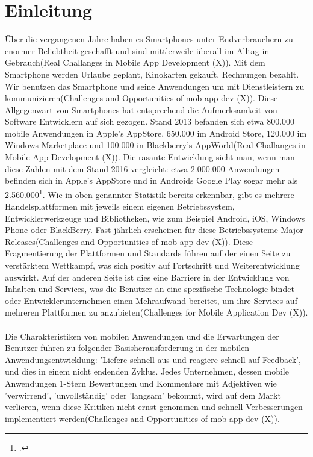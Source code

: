 \chapter{Einleitung}

Über die vergangenen Jahre haben es Smartphones unter Endverbrauchern zu enormer Beliebtheit geschafft und sind mittlerweile überall im Alltag in Gebrauch(Real Challanges in Mobile App Development (X)). Mit dem Smartphone werden Urlaube geplant, Kinokarten gekauft, Rechnungen bezahlt. Wir benutzen das Smartphone und seine Anwendungen um mit Dienstleistern zu kommunizieren(Challenges and Opportunities of mob app dev (X)). Diese Allgegenwart von Smartphones hat entsprechend die Aufmerksamkeit von Software Entwicklern auf sich gezogen. Stand 2013 befanden sich etwa 800.000 mobile Anwendungen in Apple's AppStore, 650.000 im Android Store, 120.000 im Windows Marketplace und 100.000 in Blackberry's AppWorld(Real Challanges in Mobile App Development (X)). Die rasante Entwicklung sieht man, wenn man diese Zahlen mit dem Stand 2016 vergleicht: etwa 2.000.000 Anwendungen befinden sich in Apple's AppStore und in Androids Google Play sogar mehr als 2.560.000\footcite{StatistikApps}. Wie in oben genannter Statistik bereits erkennbar, gibt es mehrere Handelsplattformen mit jeweils einem eigenen Betriebssystem, Entwicklerwerkzeuge und Bibliotheken, wie zum Beispiel Android, iOS, Windows Phone oder BlackBerry. Fast jährlich erscheinen für diese Betriebssysteme Major Releases(Challenges and Opportunities of mob app dev (X)). Diese Fragmentierung der Plattformen und Standards führen auf der einen Seite zu verstärktem Wettkampf, was sich positiv auf Fortschritt und Weiterentwicklung auswirkt. Auf der anderen Seite ist dies eine Barriere in der Entwicklung von Inhalten und Services, was die Benutzer an eine spezifische Technologie bindet oder Entwicklerunternehmen einen Mehraufwand bereitet, um ihre Services auf mehreren Plattformen zu anzubieten(Challenges for Mobile Application Dev (X)). 
\\
\\
Die Charakteristiken von mobilen Anwendungen und die Erwartungen der Benutzer führen zu folgender Basisherausforderung in der mobilen Anwendungsentwicklung: 'Liefere schnell aus und reagiere schnell auf Feedback', und dies in einem nicht endenden Zyklus. Jedes Unternehmen, dessen mobile Anwendungen 1-Stern Bewertungen und Kommentare mit Adjektiven  wie 'verwirrend', 'unvollständig' oder 'langsam' bekommt, wird auf dem Markt verlieren, wenn diese Kritiken nicht ernst genommen und schnell Verbesserungen implementiert werden(Challenges and Opportunities of mob app dev (X)). 
